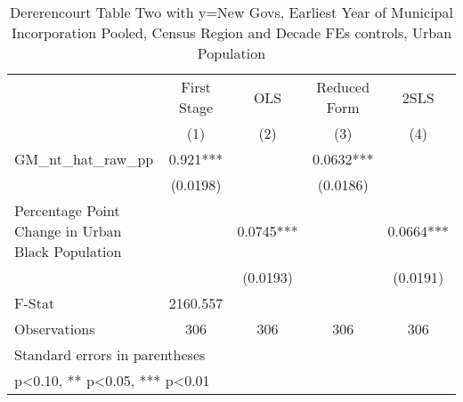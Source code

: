\begin{table}[htbp]\centering
\def\sym#1{\ifmmode^{#1}\else\(^{#1}\)\fi}
\caption{Dererencourt Table Two with y=New Govs, Earliest Year of Municipal Incorporation  Pooled, Census Region and Decade FEs controls, Urban Population}
\begin{tabular}{l*{4}{c}}
\toprule
                    & First Stage   &         OLS   &Reduced Form   &        2SLS   \\
                    &\multicolumn{1}{c}{(1)}   &\multicolumn{1}{c}{(2)}   &\multicolumn{1}{c}{(3)}   &\multicolumn{1}{c}{(4)}   \\
\midrule
GM\_nt\_hat\_raw\_pp    &       0.921***&               &      0.0632***&               \\
                    &    (0.0198)   &               &    (0.0186)   &               \\
\addlinespace
Percentage Point Change in Urban Black Population&               &      0.0745***&               &      0.0664***\\
                    &               &    (0.0193)   &               &    (0.0191)   \\
\midrule
F-Stat              &    2160.557   &               &               &               \\
Observations        &         306   &         306   &         306   &         306   \\
\bottomrule
\multicolumn{5}{l}{\footnotesize Standard errors in parentheses}\\
\multicolumn{5}{l}{\footnotesize * p<0.10, ** p<0.05, *** p<0.01}\\
\end{tabular}
\end{table}
